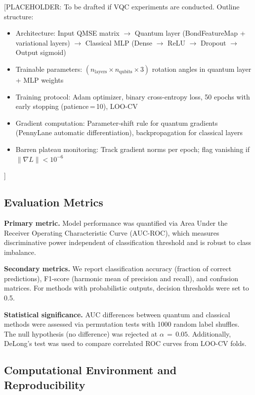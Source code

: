 [PLACEHOLDER: To be drafted if VQC experiments are conducted. Outline structure:
\begin{itemize}
\item Architecture: Input QMSE matrix $\to$ Quantum layer (BondFeatureMap + variational layers) $\to$ Classical MLP (Dense $\to$ ReLU $\to$ Dropout $\to$ Output sigmoid)
\item Trainable parameters: $(n_{\text{layers}} \times n_{\text{qubits}} \times 3)$ rotation angles in quantum layer + MLP weights
\item Training protocol: Adam optimizer, binary cross-entropy loss, 50 epochs with early stopping (patience\,=\,10), LOO-CV
\item Gradient computation: Parameter-shift rule for quantum gradients (PennyLane automatic differentiation), backpropagation for classical layers
\item Barren plateau monitoring: Track gradient norms per epoch; flag vanishing if $\|\nabla L\| < 10^{-6}$
\end{itemize}
]

\subsection{Evaluation Metrics}
\label{sec:methods:metrics}

\textbf{Primary metric.} Model performance was quantified via Area Under the Receiver Operating Characteristic Curve (AUC-ROC), which measures discriminative power independent of classification threshold and is robust to class imbalance.\cite{Fawcett2006ROC}

\textbf{Secondary metrics.} We report classification accuracy (fraction of correct predictions), F1-score (harmonic mean of precision and recall), and confusion matrices. For methods with probabilistic outputs, decision thresholds were set to 0.5.

\textbf{Statistical significance.} AUC differences between quantum and classical methods were assessed via permutation tests with 1000 random label shuffles. The null hypothesis (no difference) was rejected at $\alpha\,=\,0.05$. Additionally, DeLong's test\cite{DeLong1988ROC} was used to compare correlated ROC curves from LOO-CV folds.

\subsection{Computational Environment and Reproducibility}
\label{sec:methods:computational}

